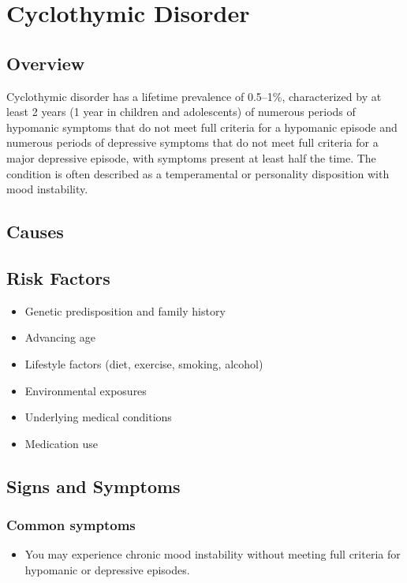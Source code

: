 \chapter{Cyclothymic Disorder}
\label{sec:Cyclothymic Disorder}

\section{Overview}
Cyclothymic disorder has a lifetime prevalence of 0.5--1\%, characterized by at least 2 years (1 year in children and adolescents) of numerous periods of hypomanic symptoms that do not meet full criteria for a hypomanic episode and numerous periods of depressive symptoms that do not meet full criteria for a major depressive episode, with symptoms present at least half the time. The condition is often described as a temperamental or personality disposition with mood instability.
\section{Causes}
\section{Risk Factors}

\begin{itemize}[noitemsep]
  \item Genetic predisposition and family history
  \item Advancing age
  \item Lifestyle factors (diet, exercise, smoking, alcohol)
  \item Environmental exposures
  \item Underlying medical conditions
  \item Medication use
\end{itemize}
\section{Signs and Symptoms}

\subsection{Common symptoms}
\begin{itemize}[noitemsep]
  \item You may experience chronic mood instability without meeting full criteria for hypomanic or depressive episodes. 
  \end{itemize}

